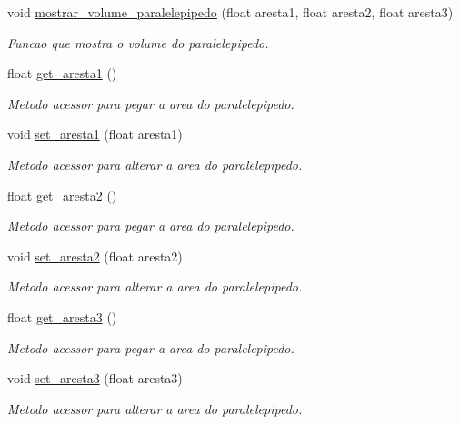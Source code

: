 \begin{DoxyCompactItemize}
void \hyperlink{classParalelepipedo_a71b8363aa56984695845eb758b4545fd}{mostrar\+\_\+volume\+\_\+paralelepipedo} (float aresta1, float aresta2, float aresta3)
\begin{DoxyCompactList}\small\item\em Funcao que mostra o volume do paralelepipedo. \end{DoxyCompactList}\item 
float \hyperlink{classParalelepipedo_a0a358a9909745342df7520db96a7f88e}{get\+\_\+aresta1} ()
\begin{DoxyCompactList}\small\item\em Metodo acessor para pegar a area do paralelepipedo. \end{DoxyCompactList}\item 
void \hyperlink{classParalelepipedo_aa4e9e622a76be557e4a38ac72e6db796}{set\+\_\+aresta1} (float aresta1)
\begin{DoxyCompactList}\small\item\em Metodo acessor para alterar a area do paralelepipedo. \end{DoxyCompactList}\item 
float \hyperlink{classParalelepipedo_a9505c63ed99ef3d6e4d489d03c08526b}{get\+\_\+aresta2} ()
\begin{DoxyCompactList}\small\item\em Metodo acessor para pegar a area do paralelepipedo. \end{DoxyCompactList}\item 
void \hyperlink{classParalelepipedo_a613fcca3e75646a03af90f642efce73d}{set\+\_\+aresta2} (float aresta2)
\begin{DoxyCompactList}\small\item\em Metodo acessor para alterar a area do paralelepipedo. \end{DoxyCompactList}\item 
float \hyperlink{classParalelepipedo_af47229ad9870c09804c0e0f958ccf6be}{get\+\_\+aresta3} ()
\begin{DoxyCompactList}\small\item\em Metodo acessor para pegar a area do paralelepipedo. \end{DoxyCompactList}\item 
void \hyperlink{classParalelepipedo_abf1d62c6b1fe4739a8fc9976d9c5b4f3}{set\+\_\+aresta3} (float aresta3)
\begin{DoxyCompactList}\small\item\em Metodo acessor para alterar a area do paralelepipedo. \end{DoxyCompactList}\end{DoxyCompactItemize}


